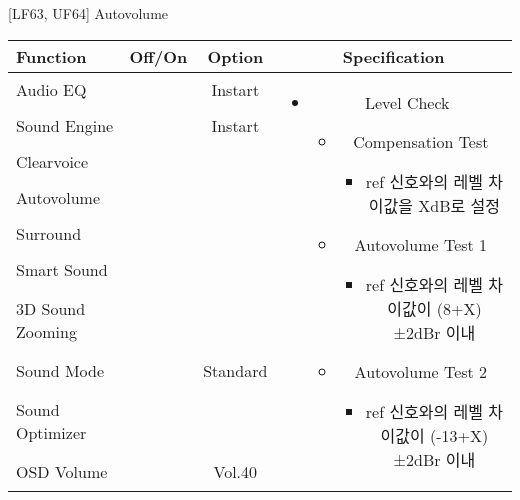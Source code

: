 \begin{frame}[t]{[LF63, UF64] Autovolume}
\begin{tiny}
\begin{tabular}{@{}lccc@{}}
\toprule
Function & Off/On & Option & Specification \\
\midrule
Audio EQ & \color{black}{Off} & Instart &
\multirow{10}{60mm}{
\begin{itemize}
\item Level Check
	\begin{itemize}
	\item Compensation Test
		\begin{itemize}\tiny
		\item ref 신호와의 레벨 차이값을 XdB로 설정
		\end{itemize}
	\item Autovolume Test 1
		\begin{itemize}\tiny
		\item ref 신호와의 레벨 차이값이 (8+X)±2dBr 이내
		\end{itemize}
	\item Autovolume Test 2
		\begin{itemize}\tiny
		\item ref 신호와의 레벨 차이값이 (-13+X)±2dBr 이내
		\end{itemize}
	\end{itemize}
\end{itemize}
} \\
Sound Engine & \color{blue}{On} & Instart & \\
Clearvoice & \color{black}{Off} & & \\
Autovolume & \color{blue}{On} & & \\
Surround & \color{black}{Off} & & \\
Smart Sound & \color{black}{Off} & & \\
3D Sound Zooming & \color{black}{Off} & & \\
Sound Mode & \color{blue}{On} & Standard & \\
Sound Optimizer & \color{black}{Off} & & \\
OSD Volume & \color{blue}{On} & Vol.40 & \\
\midrule
\end{tabular}
\end{tiny}

\end{frame}

